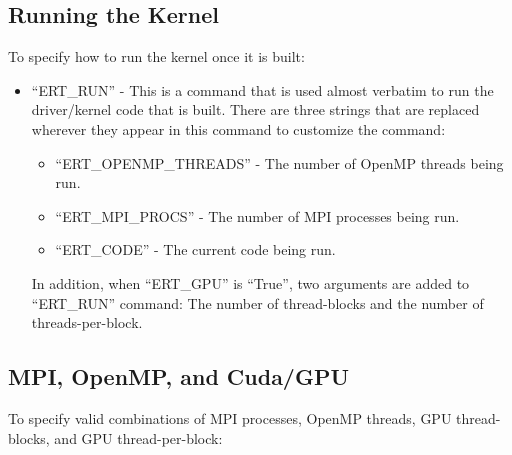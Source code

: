 \subsection{Running the Kernel}
To specify how to run the kernel once it is built:

\begin{itemize}

\vspace{-0.1in}
\item{``ERT\_\+RUN'' - This is a command that is used almost verbatim to run the
driver/kernel code that is built.  There are three strings that are replaced
wherever they appear in this command to customize the command:}
\begin{itemize}

\vspace{-0.1in}
\item{``ERT\_\+OPENMP\_\+THREADS'' - The number of OpenMP threads being run.}

\item{``ERT\_\+MPI\_\+PROCS'' - The number of MPI processes being run.}

\item{``ERT\_\+CODE'' - The current code being run.}

\end{itemize}

In addition, when ``ERT\_\+GPU'' is ``True'', two arguments are added to
``ERT\_\+RUN'' command:  The number of thread-blocks and the number of
threads-per-block.
\end{itemize}

\subsection{MPI, OpenMP, and Cuda/GPU}
To specify valid combinations of MPI processes, OpenMP threads, GPU
thread-blocks, and GPU thread-per-block:

